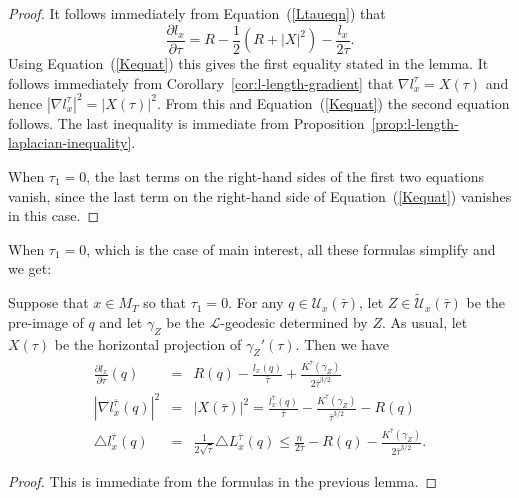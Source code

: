 \begin{proof}
\sketch
{}
 It follows immediately from Equation~(\ref{Ltaueqn}) that
$$\frac{\partial l_x}{\partial \tau}=R-\frac{1}{2}(R+|X|^2)-\frac{l_x}{2\tau}.$$
Using Equation~(\ref{Kequat}) this gives the first equality stated
in the lemma.
 It follows immediately from Corollary~\ref{cor:l-length-gradient} that
$\nabla l_x^\tau=X(\tau)$ and hence $|\nabla
l_x^\tau|^2=|X(\tau)|^2$. From this and Equation~(\ref{Kequat}) the
second equation follows. The last inequality is immediate from
Proposition~\ref{prop:l-length-laplacian-inequality}.

When $\tau_1=0$, the last terms on the right-hand sides of the first
two equations vanish, since the last term on the right-hand side of
Equation~(\ref{Kequat}) vanishes in this case.
\end{proof}

When $\tau_1=0$, which is the case of main interest, all these
formulas simplify and we get:

\begin{theorem}[Reduced length differential identities at $\tau_1=0$]\label{thm:reduced-length-differential-identities}
\label{Ueqn}
Suppose that $x\in M_T$ so that $\tau_1=0$. For any $q\in{\mathcal
U}_x(\bar\tau)$, let $Z\in \widetilde{\mathcal U}_x(\bar\tau)$ be
the pre-image of $q$ and let $\gamma_Z$ be the ${\mathcal
L}$-geodesic determined by $Z$. As usual, let $X(\tau)$ be the
horizontal projection of $\gamma_Z'(\tau)$. Then we have
\begin{eqnarray*} \frac{\partial l_x}{\partial \tau}(q) & = &
R(q)-\frac{l_x(q)}{\bar\tau}+\frac{K^{\bar\tau}(\gamma_Z)}{2\bar\tau^{3/2}}
\\
|\nabla l_x^{\bar\tau}(q)|^2 & = & |X(\bar\tau)|^2  =
\frac{l_x^{\bar\tau}(q)}{\bar\tau}-\frac{K^{\bar\tau}
(\gamma_Z)}{\bar\tau^{3/2}}-R(q)  \\
\triangle l_x^{\bar\tau}(q) & = &
\frac{1}{2\sqrt{\bar\tau}}\triangle L_x^{\bar\tau}(q)\le \frac{n}{2
\bar\tau}-R(q)-\frac{K^{\bar\tau}(\gamma_Z)}{2\bar\tau^{3/2}}.
\end{eqnarray*}
\end{theorem}

\begin{proof}
\sketch
{}
This is immediate from the formulas in the previous lemma.
\end{proof}

